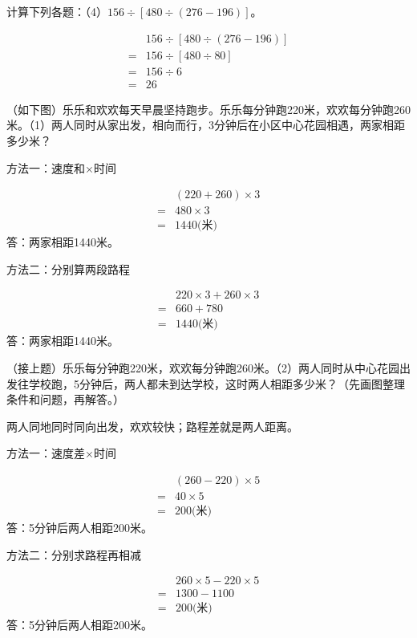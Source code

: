 计算下列各题：（4）\(156\div[480\div(276-196)]\)。\par
\begin{BookAnswer}
\[\begin{aligned} &156\div[480\div(276-196)]\\={}&156\div[480\div80]\\={}&156\div6\\={}&26\end{aligned}\]
\end{BookAnswer}

（如下图）乐乐和欢欢每天早晨坚持跑步。乐乐每分钟跑220米，欢欢每分钟跑260米。（1）两人同时从家出发，相向而行，3分钟后在小区中心花园相遇，两家相距多少米？\par
{}
\begin{BookAnswer}
方法一：速度和×时间\par \[\begin{aligned} &(220+260)\times3\\={}&480\times3\\={}&1440\text{(米)}\end{aligned}\]答：两家相距1440米。\par 方法二：分别算两段路程\par \[\begin{aligned} &220\times3+260\times3\\={}&660+780\\={}&1440\text{(米)}\end{aligned}\]答：两家相距1440米。\par
\end{BookAnswer}

（接上题）乐乐每分钟跑220米，欢欢每分钟跑260米。（2）两人同时从中心花园出发往学校跑，5分钟后，两人都未到达学校，这时两人相距多少米？（先画图整理条件和问题，再解答。）\par
{}
\begin{BookAnswer}
两人同地同时同向出发，欢欢较快；路程差就是两人距离。\par 方法一：速度差×时间\par \[\begin{aligned} &(260-220)\times5\\={}&40\times5\\={}&200\text{(米)}\end{aligned}\]答：5分钟后两人相距200米。\par 方法二：分别求路程再相减\par \[\begin{aligned} &260\times5-220\times5\\={}&1300-1100\\={}&200\text{(米)}\end{aligned}\]答：5分钟后两人相距200米。\par
{}
\end{BookAnswer}

